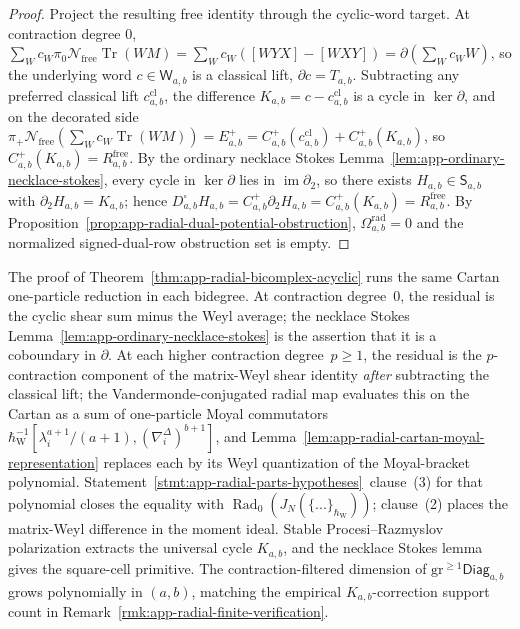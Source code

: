 \begin{proof}
  Project the resulting free identity through the cyclic-word target.
  At contraction degree \(0\),
  \(\sum_W c_W \pi_0\mathcal N_{\mathrm{free}}\operatorname{Tr}(WM)
   =\sum_W c_W([WYX]-[WXY])
   =\partial(\sum_W c_W W)\), so the underlying word
  \(c\in\mathsf W_{a,b}\) is a classical lift,
  \(\partial c=T_{a,b}\).  Subtracting any preferred classical lift
  \(c^{\mathrm{cl}}_{a,b}\), the difference
  \(K_{a,b}=c-c^{\mathrm{cl}}_{a,b}\) is a cycle in
  \(\ker\partial\), and on the decorated side
  \(\pi_+\mathcal N_{\mathrm{free}}(\sum_W c_W\operatorname{Tr}(WM))
   =E^+_{a,b}=C^+_{a,b}(c^{\mathrm{cl}}_{a,b})+C^+_{a,b}(K_{a,b})\),
  so \(C^+_{a,b}(K_{a,b})=R^{\mathrm{free}}_{a,b}\).  By the
  ordinary necklace Stokes
  Lemma~\ref{lem:app-ordinary-necklace-stokes}, every cycle in
  \(\ker\partial\) lies in
  \(\operatorname{im}\partial_2\), so there exists
  \(H_{a,b}\in\mathsf S_{a,b}\) with
  \(\partial_2H_{a,b}=K_{a,b}\); hence
  \(D^\square_{a,b}H_{a,b}
   =C^+_{a,b}\partial_2H_{a,b}
   =C^+_{a,b}(K_{a,b})
   =R^{\mathrm{free}}_{a,b}\).
  By Proposition~\ref{prop:app-radial-dual-potential-obstruction},
  \(\Omega^{\mathrm{rad}}_{a,b}=0\) and the normalized
  signed-dual-row obstruction set is empty.
\end{proof}

\begin{rmk}
\label{rmk:app-radial-bicomplex-mechanism}
  The proof of Theorem~\ref{thm:app-radial-bicomplex-acyclic} runs
  the same Cartan one-particle reduction in each bidegree.  At
  contraction degree~\(0\), the residual is the cyclic shear sum
  minus the Weyl average; the necklace Stokes
  Lemma~\ref{lem:app-ordinary-necklace-stokes} is the assertion that
  it is a coboundary in \(\partial\).  At each higher contraction
  degree~\(p\geq1\), the residual is the \(p\)-contraction component
  of the matrix-Weyl shear identity \emph{after} subtracting the
  classical lift; the Vandermonde-conjugated radial map evaluates
  this on the Cartan as a sum of one-particle Moyal commutators
  \(\hbar_{\mathrm{W}}^{-1}[\lambda_i^{a+1}/(a+1),(\nabla_i^\Delta)^{b+1}]\), and
  Lemma~\ref{lem:app-radial-cartan-moyal-representation} replaces
  each by its Weyl quantization of the Moyal-bracket polynomial.
  Statement~\ref{stmt:app-radial-parts-hypotheses}~clause~(3) for
  that polynomial closes the equality with
  \(\operatorname{Rad}_0(J_N(\{...\}_{\hbar_{\mathrm{W}}}))\); clause~(2) places the
  matrix-Weyl difference in the moment ideal.  Stable
  Procesi--Razmyslov polarization extracts the universal cycle
  \(K_{a,b}\), and the necklace Stokes lemma gives the square-cell
  primitive.  The contraction-filtered dimension of
  \(\mathrm{gr}^{\geq1}\mathsf{Diag}_{a,b}\) grows polynomially in
  \((a,b)\), matching the empirical
  \(K_{a,b}\)-correction support count in
  Remark~\ref{rmk:app-radial-finite-verification}.
\end{rmk}

